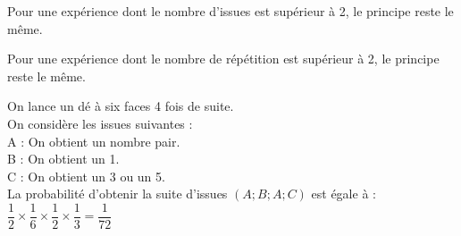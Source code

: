 
\begin{brmq}
    \begin{itemRem}
        \item Pour une expérience dont le nombre d'issues est supérieur à 2, le principe reste le même.
        \item Pour une expérience dont le nombre de répétition est supérieur à 2, le principe reste le même.
    \end{itemRem}
\end{brmq}

\begin{bexemple}
    On lance un dé à six faces 4 fois de suite.\\
    On considère les issues suivantes :\\
    A : On obtient un nombre pair.\\
    B : On obtient un 1.\\
    C : On obtient un 3 ou un 5.\\
    La probabilité d'obtenir la suite d'issues $(A ; B ; A ; C)$ est égale à :\\
    $\dfrac{1}{2}\times \dfrac{1}{6} \times \dfrac{1}{2} \times \dfrac{1}{3}=\dfrac{1}{72}$
\end{bexemple}
